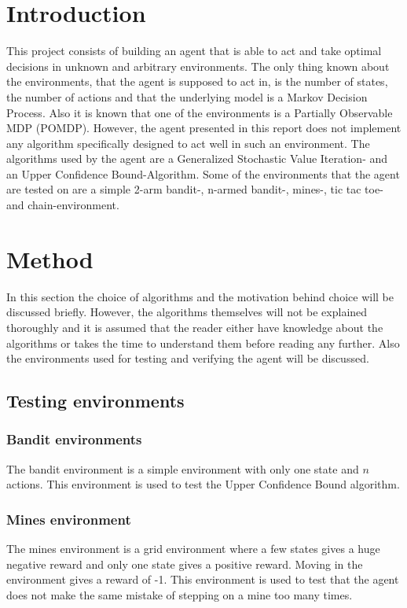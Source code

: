 \documentclass[11pt]{article}
\numberwithin{equation}{section}
\begin{document}
\begin{flushleft}

\section{Introduction}

This project consists of building an agent that is able to act and take optimal decisions in unknown and arbitrary environments. The only thing known about the environments, that the agent is supposed to act in, is the number of states, the number of actions and that the underlying model is a Markov Decision Process. Also it is known that one of the environments is a Partially Observable MDP (POMDP). However, the agent presented in this report does not implement any algorithm specifically designed to act well in such an environment. The algorithms used by the agent are a Generalized Stochastic Value Iteration- and an Upper Confidence Bound-Algorithm. Some of the environments that the agent are tested on are a simple 2-arm bandit-, n-armed bandit-, mines-, tic tac toe- and chain-environment.

\section{Method}

In this section the choice of algorithms and the motivation behind choice will be discussed briefly. However, the algorithms themselves will not be explained thoroughly and it is assumed that the reader either have knowledge about the algorithms or takes the time to understand them before reading any further. Also the environments used for testing and verifying the agent will be discussed.  \newline

\subsection{Testing environments}

\subsubsection{Bandit environments}

The bandit environment is a simple environment with only one state and $n$ actions. This environment is used to test the Upper Confidence Bound algorithm.
\subsubsection{Mines environment}
The mines environment is a grid environment where a few states gives a huge negative reward and only one state gives a positive reward. Moving in the environment gives a reward of -1. This environment is used to test that the agent does not make the same mistake of stepping on a mine too many times.


\end{flushleft}
\end{document}
